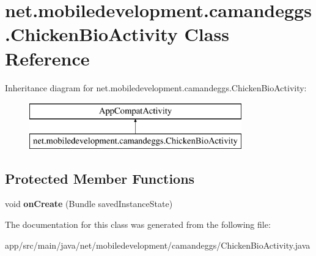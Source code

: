 \hypertarget{classnet_1_1mobiledevelopment_1_1camandeggs_1_1_chicken_bio_activity}{}\section{net.\+mobiledevelopment.\+camandeggs.\+Chicken\+Bio\+Activity Class Reference}
\label{classnet_1_1mobiledevelopment_1_1camandeggs_1_1_chicken_bio_activity}
Inheritance diagram for net.\+mobiledevelopment.\+camandeggs.\+Chicken\+Bio\+Activity\+:\begin{figure}[H]
\begin{center}
\leavevmode
\includegraphics[height=2.000000cm]{classnet_1_1mobiledevelopment_1_1camandeggs_1_1_chicken_bio_activity}
\end{center}
\end{figure}
\subsection*{Protected Member Functions}
\begin{DoxyCompactItemize}
\item 
\mbox{\label{classnet_1_1mobiledevelopment_1_1camandeggs_1_1_chicken_bio_activity_a3e35a36a0747fb2d80cefab776ae40b1}} 
void {\bfseries on\+Create} (Bundle saved\+Instance\+State)
\end{DoxyCompactItemize}


The documentation for this class was generated from the following file\+:\begin{DoxyCompactItemize}
\item 
app/src/main/java/net/mobiledevelopment/camandeggs/Chicken\+Bio\+Activity.\+java\end{DoxyCompactItemize}
